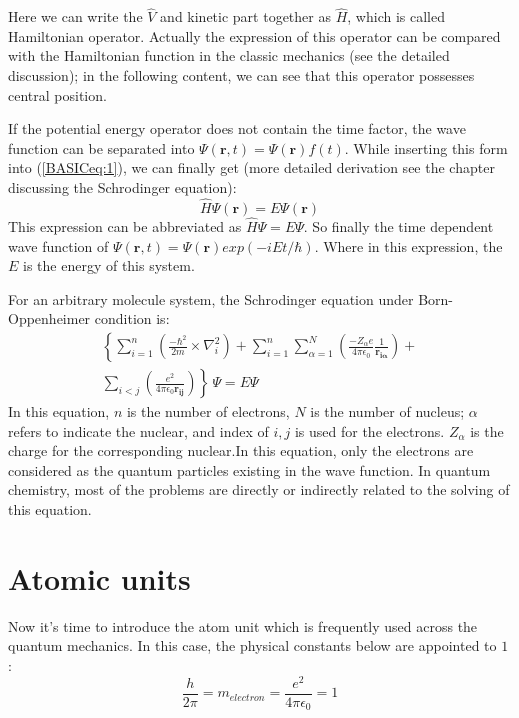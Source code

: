 Here we can write the $\hat{V}$ and kinetic part together as
$\hat{H}$, which is called Hamiltonian operator. Actually the
expression of this operator can be compared with the Hamiltonian
function in the classic mechanics (see the detailed
discussion\cite{Landau}); in the following content, we can see that
this operator possesses central position.

If the potential energy operator does not contain the time factor, the
wave function can be separated into $\Psi(\bm{r},t) =
\Psi(\bm{r})f(t)$.  While inserting this form into (\ref{BASICeq:1}),
we can finally get (more detailed derivation see the chapter
discussing the Schrodinger equation):
\begin{equation}\label{BASICeq:5}
\hat{H}\Psi(\bm{r}) = E\Psi(\bm{r})
\end{equation}
This expression can be abbreviated as $\hat{H}\Psi = E\Psi$. So
finally the time dependent wave function of $\Psi(\bm{r},t) =
\Psi(\bm{r})exp(-iEt/\hbar)$. Where in this expression, the $E$ is the
energy of this system.

For an arbitrary molecule system, the Schrodinger equation under
Born-Oppenheimer condition is:
\begin{multline}\label{BASICeq:4}
  \left\{\sum_{i=1}^{n}\left(\frac{-\hbar^{2}}{2m}\times\nabla_{i}^2\right)+
    \sum_{i=1}^{n}\sum_{\alpha=1}^{N}
    \left(\frac{-Z_{\alpha}e}{4\pi\epsilon_{0}}\frac{1}{\bm{r_{i\alpha}}}\right)+
  \right. \\
\left. \sum_{i<j}\left(\frac{e^{2}}{4\pi\epsilon_{0} \bm{r_{ij}}}\right)
    \right\}\,\Psi=E\Psi
\end{multline}
In this equation, $n$ is the number of electrons, $N$ is the number of
nucleus; $\alpha$ refers to indicate the nuclear, and index of $i,j$
is used for the electrons. $Z_{\alpha}$ is the charge for the
corresponding nuclear.In this equation, only the electrons are
considered as the quantum particles existing in the wave function. In
quantum chemistry, most of the problems are directly or indirectly
related to the solving of this equation.


\section{Atomic units}
%
%
%
%
Now it's time to introduce the atom unit which is frequently used
across the quantum mechanics. In this case, the physical constants
below are appointed to $1$:
\begin{equation}
  \label{BASICeq:7}
  \frac{h}{2\pi} = m_{electron} = \frac{e^{2}}{4\pi\epsilon_{0}} = 1
\end{equation}

